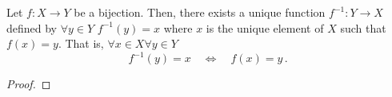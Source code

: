 \guard



\begin{prop}
\label{prop:existenceOfInverseFunction}
  Let $f:X\to Y$ be a bijection.
  Then, there exists a unique function $f^{-1}:Y\to X$ defined by $\forall y\in Y$ $f^{-1}(y)=x$ where $x$ is the unique element of $X$ such that $f(x)=y$.
  That is, $\forall x\in X\forall y\in Y$ \[ f^{-1}(y)=x\quad\iff\quad f(x)=y\,.\]
\end{prop}
\begin{proof}

\end{proof}
